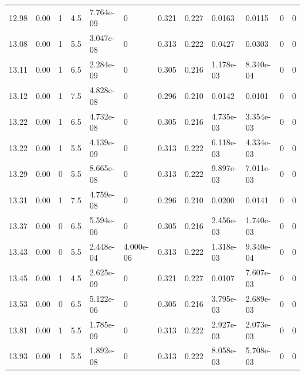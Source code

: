 \documentclass[preview]{standalone}
\begin{document}
{{{{\begin{tabular}{L{1.2cm}C{1.2cm} C{0.3cm}C{0.5cm} C{1.4cm}C{1.4cm} C{1.4cm}C{1.4cm} C{1.6cm}C{1.6cm} C{1.6cm}C{1.6cm}}
  12.98  &  0.00  & 1     & 4.5 &  7.764e-09  & 0  &  0.321&   0.227& 0.0163 & 0.0115   &  0 & 0  \\ 
  13.08  &  0.00  & 1     & 5.5 &  3.047e-08  & 0  &  0.313&   0.222& 0.0427 & 0.0303   &  0 & 0  \\ 
  13.11  &  0.00  & 1     & 6.5 &  2.284e-09  & 0  &  0.305&   0.216& 1.178e-03 & 8.340e-04   &  0 & 0  \\ 
  13.12  &  0.00  & 1     & 7.5 &  4.828e-08  & 0  &  0.296&   0.210& 0.0142 & 0.0101   &  0 & 0  \\ 
  13.22  &  0.00  & 1     & 6.5 &  4.732e-08  & 0  &  0.305&   0.216& 4.735e-03 & 3.354e-03   &  0 & 0  \\ 
  13.22  &  0.00  & 1     & 5.5 &  4.139e-09  & 0  &  0.313&   0.222& 6.118e-03 & 4.334e-03   &  0 & 0  \\ 
  13.29  &  0.00  & 0     & 5.5 &  8.665e-08  & 0  &  0.313&   0.222& 9.897e-03 & 7.011e-03   &  0 & 0  \\ 
  13.31  &  0.00  & 1     & 7.5 &  4.759e-08  & 0  &  0.296&   0.210& 0.0200 & 0.0141   &  0 & 0  \\ 
  13.37  &  0.00  & 0     & 6.5 &  5.594e-06  & 0  &  0.305&   0.216& 2.456e-03 & 1.740e-03   &  0 & 0  \\ 
  13.43  &  0.00  & 0     & 5.5 &  2.448e-04  & 4.000e-06  &  0.313&   0.222& 1.318e-03 & 9.340e-04   &  0 & 0  \\ 
  13.45  &  0.00  & 1     & 4.5 &  2.625e-09  & 0  &  0.321&   0.227& 0.0107 & 7.607e-03   &  0 & 0  \\ 
  13.53  &  0.00  & 0     & 6.5 &  5.122e-06  & 0  &  0.305&   0.216& 3.795e-03 & 2.689e-03   &  0 & 0  \\ 
  13.81  &  0.00  & 1     & 5.5 &  1.785e-09  & 0  &  0.313&   0.222& 2.927e-03 & 2.073e-03   &  0 & 0  \\ 
  13.93  &  0.00  & 1     & 5.5 &  1.892e-08  & 0  &  0.313&   0.222& 8.058e-03 & 5.708e-03   &  0 & 0  \\ 
\hline 
\end{tabular} 

}}}}
\end{document}
